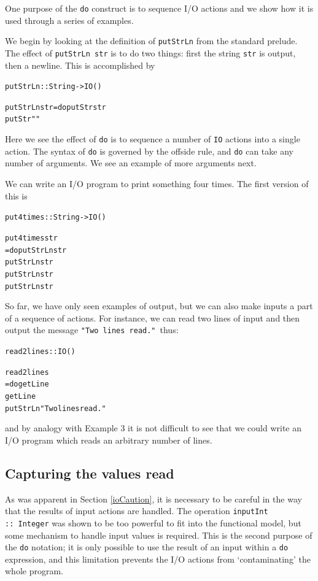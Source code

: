One purpose of the \texttt{do} construct is to sequence I/O actions 
and we show how it is used through a series of examples.
\begin{example}
We begin by looking at
the definition of \texttt{putStrLn} from the standard
prelude. The effect of \texttt{putStrLn str} is to do two things: first
the string \texttt{str} is output, then a newline. This is accomplished
by
\begin{alltt}
putStrLn :: String -> IO ()

putStrLn str = do putStr str
                  putStr ""
\end{alltt}
Here we see the effect of \texttt{do} is to sequence a number of
\texttt{IO} actions into a single action. The syntax of \texttt{do} is
governed by the offside rule, and \texttt{do} can take any number of
arguments. We see an example of more arguments next.

We can write an I/O program to print something four times. The first
version of this is 
\begin{alltt}
put4times :: String -> IO ()

put4times str 
  = do putStrLn str
       putStrLn str
       putStrLn str
       putStrLn str
\end{alltt}


So far, we have only seen examples of output, but we can also make inputs a
part of a sequence of actions. For instance, we can read two lines of input and
then output the message \texttt{"Two lines read."}\ thus:
\begin{alltt}
read2lines :: IO ()

read2lines 
  = do getLine
       getLine
       putStrLn "Two lines read."
\end{alltt}
and by analogy with Example 3 it is not difficult to see that we could
write an I/O program which reads an arbitrary number of lines.

\end{example}
\subsection*{Capturing the values read}

As was apparent in Section \ref{ioCaution}, it is necessary to be careful in the
way that the results of input actions are handled. The operation
\texttt{inputInt ::\ Integer} was shown to be too powerful to fit into the
functional model, but some mechanism to handle input values is required. This is the
second purpose of the \texttt{do} notation; it is only possible to use the result of an
input within a \texttt{do} expression, and this limitation prevents the
I/O actions from `contaminating' the whole program. 

